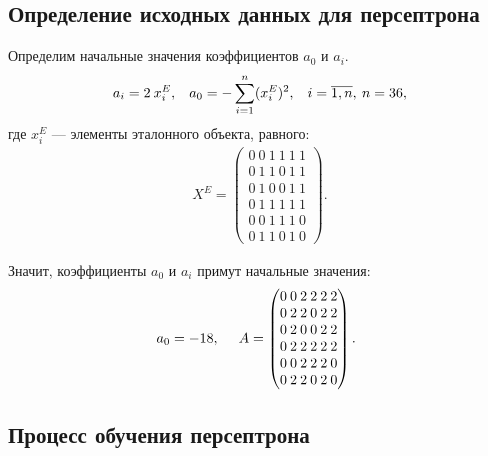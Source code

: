 \subsection{Определение исходных данных для персептрона}

Определим начальные значения коэффициентов $a_0$ и $a_i$.
\begin{equation*}
  a_i = 2 \: x_i^E, \hspace{3mm} a_0 = - \sum_{i=1}^{n} (x_i^E)^2, \hspace{3mm} i = \overline{1,n}, \: n=36,
\end{equation*}
где $x_i^E$ --- элементы эталонного объекта, равного:
\[
  \begin{array}{lc}
    X^E = 
    \left(
      \begin{matrix}
        0 \: 0 \: 1 \: 1 \: 1 \: 1 \\
        0 \: 1 \: 1 \: 0 \: 1 \: 1 \\
        0 \: 1 \: 0 \: 0 \: 1 \: 1 \\
        0 \: 1 \: 1 \: 1 \: 1 \: 1 \\
        0 \: 0 \: 1 \: 1 \: 1 \: 0 \\
        0 \: 1 \: 1 \: 0 \: 1 \: 0
      \end{matrix}
    \right).
  \end{array}
\]

Значит, коэффициенты $a_0$ и $a_i$ примут начальные значения:
\begin{align*}
  a_0 = -18, \hspace{3mm}
  \begin{array}{lc}
    A = 
    \left(
      \begin{matrix}
        0 \: 0 \: 2 \: 2 \: 2 \: 2 \\
        0 \: 2 \: 2 \: 0 \: 2 \: 2 \\
        0 \: 2 \: 0 \: 0 \: 2 \: 2 \\
        0 \: 2 \: 2 \: 2 \: 2 \: 2 \\
        0 \: 0 \: 2 \: 2 \: 2 \: 0 \\
        0 \: 2 \: 2 \: 0 \: 2 \: 0
      \end{matrix}
    \right).
  \end{array}
\end{align*}


\newpage
\subsection{Процесс обучения персептрона}

